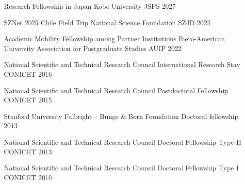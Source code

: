 
\begin{cvhonors}

\cvhonor
    {Research Fellowship in Japan}
    {Kobe University}
    {JSPS}
    {2027}

\cvhonor
    {SZNet 2025 Chile Field Trip}
    {National Science Foundation}
    {SZ4D}
    {2025}

\cvhonor
    {Academic Mobility Fellowship among Partner Institutions}
    {Ibero-American University Association for Postgraduate Studies}
    {AUIP}
    {2022}

\cvhonor
    {National Scientific and Technical Research Council}
    {International Research Stay}
    {CONICET}
    {2016}

\cvhonor
    {National Scientific and Technical Research Council}
    {Postdoctoral Fellowship}
    {CONICET}
    {2015}

\cvhonor
    {Stanford University}
    {Fulbright -- Bunge \& Born Foundation}
    {Doctoral fellowship}
    {2013}

\cvhonor
   {National Scientific and Technical Research Council}
    {Doctoral Fellowship Type II}
    {CONICET}
    {2013}

\cvhonor
  {National Scientific and Technical Research Council}
    {Doctoral Fellowship Type I}
    {CONICET}
    {2010}

\end{cvhonors}
